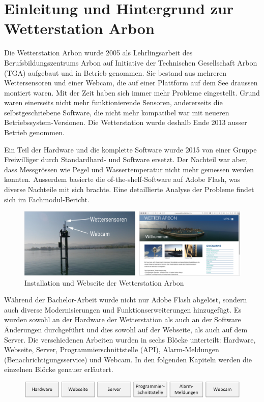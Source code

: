 \section*{Einleitung und Hintergrund zur Wetterstation Arbon}

Die Wetterstation Arbon wurde 2005 als Lehrlingsarbeit des Berufsbildungszentrums Arbon auf Initiative der Technischen Gesellschaft Arbon (TGA) aufgebaut und in Betrieb genommen. Sie bestand aus mehreren Wettersensoren und einer Webcam, die auf einer Plattform auf dem See draussen montiert waren. Mit der Zeit haben sich immer mehr Probleme eingestellt. Grund waren einerseits nicht mehr funktionierende Sensoren, andererseits die selbstgeschriebene Software, die nicht mehr kompatibel war mit neueren Betriebssystem-Versionen. Die Wetterstation wurde deshalb Ende 2013 ausser Betrieb genommen.

Ein Teil der Hardware und die komplette Software wurde 2015 von einer Gruppe Freiwilliger durch Standardhard- und Software ersetzt. Der Nachteil war aber, dass Messgrössen wie Pegel und Wassertemperatur nicht mehr gemessen werden konnten. Ausserdem basierte die of-the-shelf-Software auf Adobe Flash, was diverse Nachteile mit sich brachte. Eine detaillierte Analyse der Probleme findet sich im Fachmodul-Bericht\cite{BilWie2018MUIu}.

\vspace{5mm} %
\begin{figure}[htbp!]
	\centering
	\includegraphics[width=1\linewidth]{img/kombi}
	\caption{Installation und Webseite der Wetterstation Arbon}
	\label{img:wetterstation}
\end{figure}
\vspace{3mm} %

\noindent
Während der Bachelor-Arbeit wurde nicht nur Adobe Flash abgelöst, sondern auch diverse Modernisierungen und Funktionserweiterungen hinzugefügt. Es wurden sowohl an der Hardware der Wetterstation als auch an der Software Änderungen durchgeführt und dies sowohl auf der Webseite, als auch auf dem Server. Die verschiedenen Arbeiten wurden in sechs Blöcke unterteilt: Hardware, Webseite, Server, Programmierschnittstelle (API), Alarm-Meldungen (Benachrichtigungsservice) und Webcam. In den folgenden Kapiteln werden die einzelnen Blöcke genauer erläutert.

\vspace{5mm} %
\begin{figure}[htbp!]
	\centering
	\includegraphics[width=1\linewidth]{img/module}
	\label{img:module}
\end{figure}
\newpage
